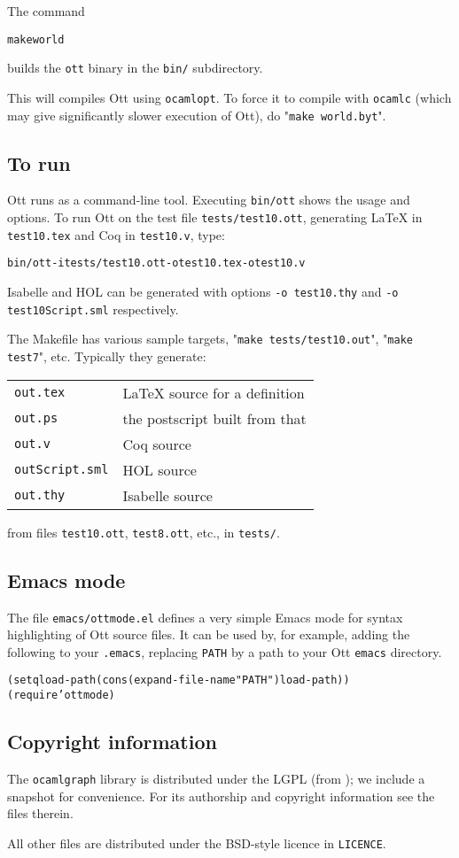 The command
\begin{alltt}
  make world
\end{alltt}
builds the \texttt{ott} binary in the \texttt{bin/} subdirectory.  

This will compiles Ott using \texttt{ocamlopt}.  To force it to
compile with \texttt{ocamlc} (which may give significantly slower execution
of Ott), do "\texttt{make world.byt}".


\subsection{To run}
\mydummy{------}
Ott runs as a command-line tool. Executing \texttt{bin/ott} shows the
usage and options.  To run Ott on the test file
\texttt{tests/test10.ott}, generating LaTeX in \texttt{test10.tex} and
Coq in \texttt{test10.v}, type:
\begin{alltt}
  bin/ott -i tests/test10.ott -o test10.tex -o test10.v
\end{alltt}
Isabelle and HOL can be generated with options \texttt{-o test10.thy} and
\texttt{-o test10Script.sml} respectively.

The Makefile has various sample targets, "\texttt{make tests/test10.out}",
"\texttt{make test7}", etc.  Typically they generate:\par\noindent
\begin{tabular}{ll}
  \texttt{out.tex}&        LaTeX source for a definition\\
  \texttt{out.ps}&         the postscript built from that\\
  \texttt{out.v}&          Coq source\\
  \texttt{outScript.sml}&  HOL source\\
  \texttt{out.thy}&        Isabelle source
\end{tabular}\par\noindent
from files \texttt{test10.ott}, \texttt{test8.ott}, etc., in \texttt{tests/}.


\subsection{Emacs mode}
\mydummy{----------}
The file \texttt{emacs/ottmode.el} defines a very simple Emacs mode for syntax
highlighting of Ott source files.  It can be used by, for example,
adding the following to your \texttt{.emacs}, replacing \texttt{PATH} by a path to your
Ott \texttt{emacs} directory.
\begin{alltt}
(setq load-path (cons (expand-file-name "PATH") load-path))
(require 'ottmode)
\end{alltt}


\subsection{Copyright information}
\mydummy{---------------------}
The \texttt{ocamlgraph} library is distributed under the LGPL (from
); we include a snapshot
for convenience. For its authorship and copyright information see the
files therein.

All other files are distributed under the BSD-style licence in \texttt{LICENCE}.

